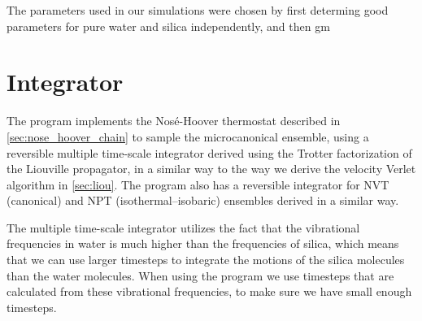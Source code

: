 The parameters used in our simulations were chosen by first determing good parameters for pure water and silica independently, and then gm


\section{Integrator\label{sec:sio2_integrator}}

The program implements the Nos\'e-Hoover thermostat described in \cref{sec:nose_hoover_chain} to sample the microcanonical ensemble, using a reversible multiple time-scale integrator derived using the Trotter factorization of the Liouville propagator\cite{tuckerman1992reversible}, in a similar way to the way we derive the velocity Verlet algorithm in \cref{sec:liou}. The program also has a reversible integrator for NVT (canonical) and NPT (isothermal–isobaric) ensembles\cite{martyna1996explicit} derived in a similar way.

The multiple time-scale integrator utilizes the fact that the vibrational frequencies in water is much higher than the frequencies of silica, which means that we can use larger timesteps to integrate the motions of the silica molecules than the water molecules. When using the program we use timesteps that are calculated from these vibrational frequencies, to make sure we have small enough timesteps.
